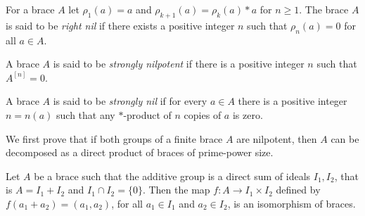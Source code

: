 \begin{definition}
For a brace $A$ let $\rho_1(a)=a$ and $\rho_{k+1}(a)=\rho_k(a)*a$ for
$n\geq1$.  The brace $A$ is said to be \emph{right nil} if there
exists a positive integer $n$ such that $\rho_n(a)=0$ for all $a\in A$. 
\end{definition}



\begin{definition}
A brace $A$ is said to be \emph{strongly nilpotent}
if there is a positive integer $n$ such that $A^{[n]}=0$.
\end{definition}

\begin{definition}
    A brace $A$ is said to be \emph{strongly nil} if for every
    $a\in A$ there is a positive integer $n=n(a)$ such that any $*$-product of
    $n$ copies of $a$ is zero.
\end{definition}


%
%

We first prove that if both groups of a finite brace $A$ are
nilpotent, then $A$ can be decomposed as a direct product of braces
of prime-power size. 

\begin{lemma}
\label{sum}
    Let $A$ be a brace such that the additive
group is a direct sum of ideals $I_1,I_2$, that is $A=I_1+I_2$ and
$I_1\cap I_2=\{0\}$. Then the map $f:A\rightarrow I_1\times I_2$
defined by $f(a_1+a_2)=(a_1,a_2)$, for all $a_1\in I_1$ and $a_2\in
I_2$, is an isomorphism of braces.
\end{lemma}

